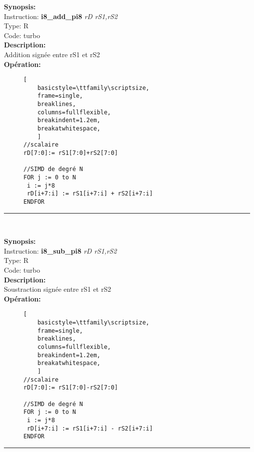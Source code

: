 {\scriptsize
\textbf{Synopsis:}\\
Instruction: \textbf{i8\_add\_pi8 } \textit{rD rS1,rS2}\\
Type: R\\
Code: turbo\\
\textbf{Description:}\\
Addition signée entre rS1 et rS2\\
\textbf{Opération:}\\
    \begin{figure}[H]
    \begin{lstlisting}[
    basicstyle=\ttfamily\scriptsize,
    frame=single,
    breaklines,
    columns=fullflexible,
    breakindent=1.2em,
    breakatwhitespace,
    ]
//scalaire
rD[7:0]:= rS1[7:0]+rS2[7:0]
    
//SIMD de degré N
FOR j := 0 to N    
 i := j*8    
 rD[i+7:i] := rS1[i+7:i] + rS2[i+7:i] 
ENDFOR
\end{lstlisting}
\end{figure}
}
\rule{8cm}{0.4pt}\\
{\scriptsize
\textbf{Synopsis:}\\
Instruction: \textbf{i8\_sub\_pi8 } \textit{rD rS1,rS2}\\
Type: R\\
Code: turbo\\
\textbf{Description:}\\
Soustraction signée entre rS1 et rS2\\
\textbf{Opération:}\\
    \begin{figure}[H]
    \begin{lstlisting}[
    basicstyle=\ttfamily\scriptsize,
    frame=single,
    breaklines,
    columns=fullflexible,
    breakindent=1.2em,
    breakatwhitespace,
    ]
//scalaire
rD[7:0]:= rS1[7:0]-rS2[7:0]
    
//SIMD de degré N
FOR j := 0 to N    
 i := j*8    
 rD[i+7:i] := rS1[i+7:i] - rS2[i+7:i]  
ENDFOR
\end{lstlisting}
\end{figure}
}
\rule{8cm}{0.4pt}\\
